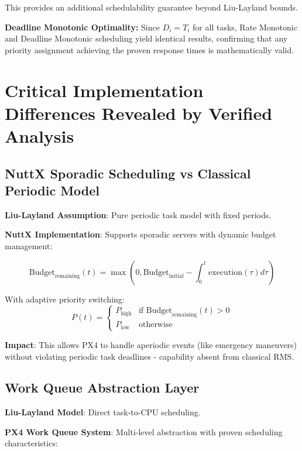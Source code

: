 \documentclass[12pt,a4paper]{article}
\begin{document}
This provides an additional schedulability guarantee beyond Liu-Layland bounds.

\textbf{Deadline Monotonic Optimality:}
Since $D_i = T_i$ for all tasks, Rate Monotonic and Deadline Monotonic scheduling yield identical results, confirming that any priority assignment achieving the proven response times is mathematically valid.

\section{Critical Implementation Differences Revealed by Verified Analysis}

\subsection{NuttX Sporadic Scheduling vs Classical Periodic Model}

\textbf{Liu-Layland Assumption}: Pure periodic task model with fixed periods.

\textbf{NuttX Implementation}: Supports sporadic servers with dynamic budget management:

\begin{equation}
\text{Budget}_{\text{remaining}}(t) = \max(0, \text{Budget}_{\text{initial}} - \int_0^t \text{execution}(\tau) d\tau)
\end{equation}

With adaptive priority switching:
\begin{equation}
P(t) = \begin{cases}
P_{\text{high}} & \text{if Budget}_{\text{remaining}}(t) > 0 \\
P_{\text{low}} & \text{otherwise}
\end{cases}
\end{equation}

\textbf{Impact}: This allows PX4 to handle aperiodic events (like emergency maneuvers) without violating periodic task deadlines - capability absent from classical RMS.

\subsection{Work Queue Abstraction Layer}

\textbf{Liu-Layland Model}: Direct task-to-CPU scheduling.

\textbf{PX4 Work Queue System}: Multi-level abstraction with proven scheduling characteristics:
\end{document}
